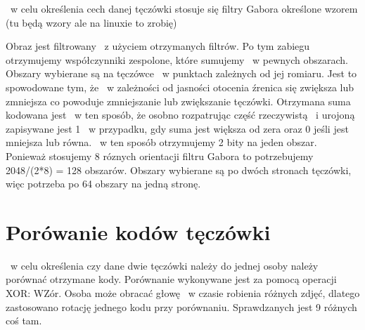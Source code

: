 ~w celu określenia cech danej tęczówki stosuje się filtry Gabora określone wzorem (tu będą wzory ale na linuxie to zrobię)

Obraz jest filtrowany ~z użyciem otrzymanych filtrów. Po tym zabiegu otrzymujemy współczynniki zespolone, które sumujemy ~w pewnych obszarach. Obszary wybierane są na tęczówce ~w punktach zależnych od jej romiaru. Jest to spowodowane tym, że ~w zależności od jasności otocenia źrenica się zwiększa lub zmniejsza co powoduje zmniejszanie lub zwiększanie tęczówki. Otrzymana suma kodowana jest ~w ten sposób, że osobno rozpatrując część rzeczywistą ~i urojoną zapisywane jest 1 ~w przypadku, gdy suma jest większa od zera oraz 0 jeśli jest mniejsza lub równa. ~w ten sposób otrzymujemy 2 bity na jeden obszar. Ponieważ stosujemy 8 róznych orientacji filtru Gabora to potrzebujemy 2048/(2*8) = 128 obszarów. Obszary wybierane są po dwóch stronach tęczówki, więc potrzeba po 64 obszary na jedną stronę.

\section{Porówanie kodów tęczówki}
\label{sec:porownanieKodow}
~w celu określenia czy dane dwie tęczówki należy do jednej osoby należy porównać otrzymane kody. Porównanie wykonywane jest za pomocą operacji XOR: WZór. Osoba może obracać głowę ~w czasie robienia różnych zdjęć, dlatego zastosowano rotację jednego kodu przy porównaniu. Sprawdzanych jest 9 różnych coś tam.
